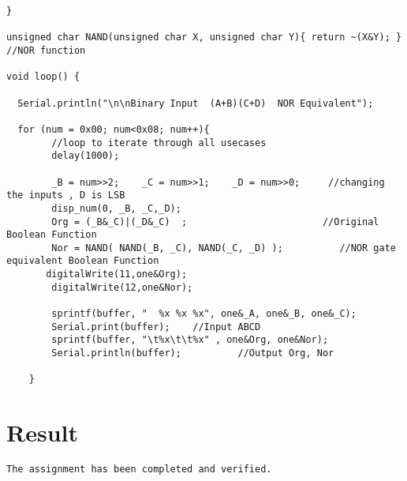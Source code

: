 \documentclass{article}
\begin{document}
\begin{verbatim}
}

unsigned char NAND(unsigned char X, unsigned char Y){ return ~(X&Y); } //NOR function

void loop() {

  Serial.println("\n\nBinary Input  (A+B)(C+D)  NOR Equivalent");

  for (num = 0x00; num<0x08; num++){
        //loop to iterate through all usecases
        delay(1000);

        _B = num>>2;    _C = num>>1;    _D = num>>0;     //changing the inputs , D is LSB
        disp_num(0, _B, _C,_D);
        Org = (_B&_C)|(_D&_C)  ;                        //Original Boolean Function
        Nor = NAND( NAND(_B, _C), NAND(_C, _D) );          //NOR gate equivalent Boolean Function
	   digitalWrite(11,one&Org);
        digitalWrite(12,one&Nor);

        sprintf(buffer, "  %x %x %x", one&_A, one&_B, one&_C);
        Serial.print(buffer);    //Input ABCD
        sprintf(buffer, "\t%x\t\t%x" , one&Org, one&Nor);
        Serial.println(buffer);          //Output Org, Nor

    }

\end{verbatim}

\section{Result}

\begin{verbatim}
The assignment has been completed and verified.
\end{verbatim}
\end{document}
